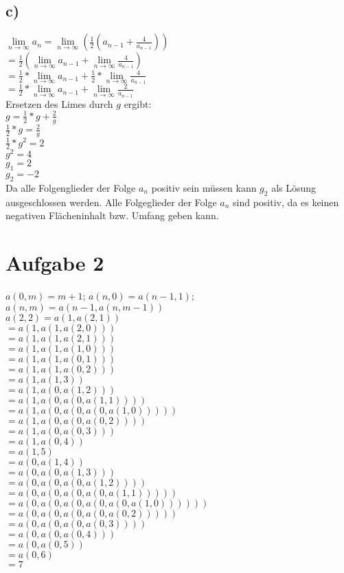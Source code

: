 \documentclass{article}
\begin{document}
	\subsection*{c)}
	$\lim\limits_{n\to\infty} a_{n} = \lim\limits_{n\to\infty}(\frac{1}{2}(a_{n-1}+\frac{4}{a_{n-1}}))$ \\
	$= \frac{1}{2}(\lim\limits_{n\to\infty}a_{n-1}+ \lim\limits_{n\to\infty}\frac{4}{a_{n-1}})$ \\
	$= \frac{1}{2} * \lim\limits_{n\to\infty}a_{n-1} + \frac{1}{2} * \lim\limits_{n\to\infty}\frac{4}{a_{n-1}}$ \\
	$= \frac{1}{2} * \lim\limits_{n\to\infty}a_{n-1} +  \lim\limits_{n\to\infty}\frac{2}{a_{n-1}}$ \\
	Ersetzen des Limes durch $g$ ergibt: \\
	$g = \frac{1}{2}*g + \frac{2}{g}$ \\
	$\frac{1}{2}*g = \frac{2}{g}$ \\
	$\frac{1}{2}*g^{2} = 2$ \\
	$g^{2} = 4$ \\
	$g_{1} = 2$ \\
	$g_{2} = -2$ \\
	Da alle Folgenglieder der Folge $ a_{n}$ positiv sein müssen kann $g_{2}$ als Lösung ausgeschlossen werden. Alle Folgeglieder der Folge $a_{n}$ sind positiv, da es keinen negativen Flächeninhalt bzw. Umfang geben kann.
	
	\section*{Aufgabe 2}
	$a(0,m) = m + 1$; $a(n,0) = a(n-1, 1)$; $a(n,m) = a(n-1, a(n, m-1))$ \\
	$a(2,2) = a(1,a(2,1))$ \\
	$= a(1,a(1,a(2,0)))$ \\
	$= a(1,a(1,a(2,1)))$ \\
	$= a(1,a(1,a(1,0)))$ \\
	$= a(1,a(1,a(0,1)))$ \\
	$= a(1,a(1,a(0,2)))$ \\
	$= a(1,a(1,3))$ \\
	$= a(1,a(0,a(1,2)))$ \\
	$= a(1,a(0,a(0,a(1, 1))))$ \\
	$= a(1,a(0,a(0,a(0, a(1, 0)))))$ \\
	$= a(1,a(0,a(0,a(0, 2))))$ \\
	$= a(1,a(0,a(0,3)))$ \\
	$= a(1,a(0,4))$ \\
	$= a(1,5)$ \\
	$= a(0,a(1,4))$ \\
	$= a(0,a(0,a(1,3)))$ \\
	$= a(0,a(0,a(0,a(1,2))))$ \\
	$= a(0,a(0,a(0,a(0,a(1,1)))))$ \\
	$= a(0,a(0,a(0,a(0,a(0,a(1,0))))))$ \\
	$= a(0,a(0,a(0,a(0,a(0,2)))))$ \\
	$= a(0,a(0,a(0,a(0,3))))$ \\
	$= a(0,a(0,a(0,4)))$ \\
	$= a(0,a(0,5))$ \\
	$= a(0,6)$ \\
	$= 7$
\end{document}
